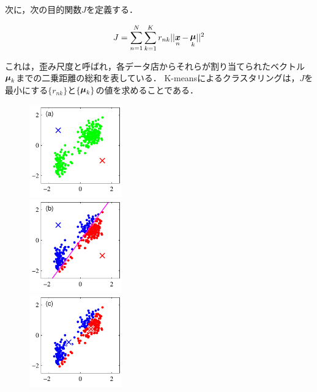 次に，次の目的関数$J$を定義する．

\begin{align}
  J = \sum_{n=1}^{N} \sum_{k=1}^{K} r_{nk} || {\displaystyle \mathop{\bm{x}}_n - \mathop{\bm{\mu}}_k} || ^2
\end{align}

これは，歪み尺度と呼ばれ，各データ店からそれらが割り当てられたベクトル$\mathop{\bm{\mu}}_k$までの二乗距離の総和を表している．
K-meansによるクラスタリングは，$J$を最小にする$\{r_{nk}\}$と$\{\mathop{\bm{\mu}}_k\}$の値を求めることである．

\begin{figure}[htbp]
  \begin{minipage}{0.33\hsize}
    \begin{center}
      \includegraphics[width=40mm]{img/kmeans/Figure91a.pdf}
    \end{center}
  \end{minipage}
  \begin{minipage}{0.33\hsize}
    \begin{center}
      \includegraphics[width=40mm]{img/kmeans/Figure91b.pdf}
    \end{center}
  \end{minipage}
  \begin{minipage}{0.33\hsize}
    \begin{center}
      \includegraphics[width=40mm]{img/kmeans/Figure91c.pdf}

\end{center}
\end{minipage}
\end{figure}
